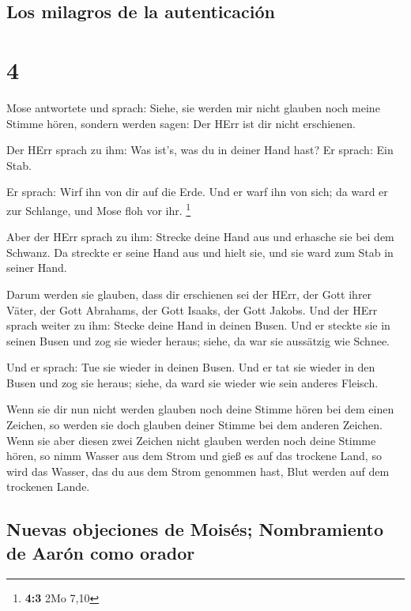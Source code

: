 \hypertarget{los-milagros-de-la-autenticaciuxf3n}{%
\subsection{Los milagros de la
autenticación}\label{los-milagros-de-la-autenticaciuxf3n}}

\hypertarget{section-3}{%
\section{4}\label{section-3}}

 Mose antwortete und sprach: Siehe, sie werden mir nicht
glauben noch meine Stimme hören, sondern werden sagen: Der HErr ist dir
nicht erschienen.

 Der HErr sprach zu ihm: Was ist's, was du in deiner Hand
hast? Er sprach: Ein Stab.

 Er sprach: Wirf ihn von dir auf die Erde. Und er warf ihn
von sich; da ward er zur Schlange, und Mose floh vor ihr. \footnote{\textbf{4:3}
  2Mo 7,10}

 Aber der HErr sprach zu ihm: Strecke deine Hand aus und
erhasche sie bei dem Schwanz. Da streckte er seine Hand aus und hielt
sie, und sie ward zum Stab in seiner Hand.

 Darum werden sie glauben, dass dir erschienen sei der
HErr, der Gott ihrer Väter, der Gott Abrahams, der Gott Isaaks, der Gott
Jakobs.  Und der HErr sprach weiter zu ihm: Stecke deine
Hand in deinen Busen. Und er steckte sie in seinen Busen und zog sie
wieder heraus; siehe, da war sie aussätzig wie Schnee.

 Und er sprach: Tue sie wieder in deinen Busen. Und er tat
sie wieder in den Busen und zog sie heraus; siehe, da ward sie wieder
wie sein anderes Fleisch.

 Wenn sie dir nun nicht werden glauben noch deine Stimme
hören bei dem einen Zeichen, so werden sie doch glauben deiner Stimme
bei dem anderen Zeichen.  Wenn sie aber diesen zwei
Zeichen nicht glauben werden noch deine Stimme hören, so nimm Wasser aus
dem Strom und gieß es auf das trockene Land, so wird das Wasser, das du
aus dem Strom genommen hast, Blut werden auf dem trockenen Lande.

\hypertarget{nuevas-objeciones-de-moisuxe9s-nombramiento-de-aaruxf3n-como-orador}{%
\subsection{Nuevas objeciones de Moisés; Nombramiento de Aarón como
orador}\label{nuevas-objeciones-de-moisuxe9s-nombramiento-de-aaruxf3n-como-orador}}

